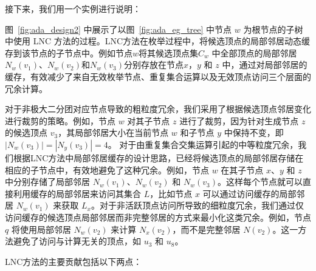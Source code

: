 接下来，我们用一个实例进行说明：

\begin{example}
  图~\ref{fig:ada_design2} 中展示了以图~\ref{fig:ada_eg_tree} 中节点 $w$ 为根节点的子树中使用 LNC 方法的过程。LNC方法在枚举过程中，将候选顶点的局部邻居动态缓存到该节点的子节点中。例如节点$w$将其候选顶点集$C_w$ 中全部顶点的局部邻居$N_w(v_1)$、$N_w(v_2)$和$N_w(v_3)$分别存放在节点$x$，$y$ 和 $z$ 中，通过对局部邻居的缓存，有效减少了来自无效枚举节点、重复集合运算以及无效顶点访问三个层面的冗余计算。
		
	对于非极大二分团对应节点导致的粗粒度冗余，我们采用了根据候选顶点邻居变化进行裁剪的策略。例如，节点 $w$ 对其子节点 $z$ 进行了裁剪，因为针对生成节点 $z$ 的候选顶点 $v_3$，其局部邻居大小在当前节点 $w$ 和子节点 $y$ 中保持不变，即 $|N_w(v_3)| = |N_y(v_3)| = 4$。	对于由重复集合交集运算引起的中等粒度冗余，我们根据LNC方法中局部邻居缓存的设计思路，已经将候选顶点的局部邻居存储在相应的子节点中，有效地避免了这种冗余。例如，节点 $w$ 在其子节点 $x$、$y$ 和 $z$ 中分别存储了局部邻居 $N_w(v_1)$、$N_w(v_2)$ 和 $N_w(v_3)$。这样每个节点就可以直接利用缓存的局部邻居来访问其集合 $L$，比如节点 $x$ 可以通过访问缓存的局部邻居 $N_w(v_1)$ 来获取 $L_x$。对于非活跃顶点访问所导致的细粒度冗余，我们通过仅访问缓存的候选顶点局部邻居而非完整邻居的方式来最小化这类冗余。例如，节点 $q$ 将使用局部邻居 $N_w(v_2)$ 来计算 $N_x(v_2)$，而不是完整邻居 $N(v_2)$。这一方法避免了访问与计算无关的顶点，如 $u_3$ 和 $u_8$。







\end{example}

LNC方法的主要贡献包括以下两点：

